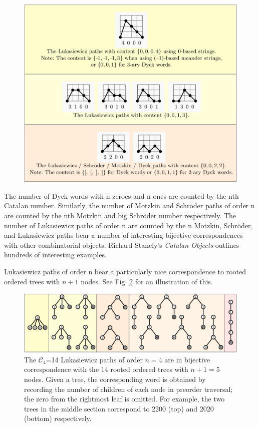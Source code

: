 \begin{figure}[]
	\centering
	\includegraphics[width = .95 \textwidth]{paths.png}
	\caption{}
	\label{paths}
\end{figure}


The number of Dyck words with n zeroes and n ones are counted by the nth Catalan number.  Similarly, the number of Motzkin and Schröder paths of order n are counted by the nth Motzkin and big Schröder number respectively. The number of Lukasiewicz paths of order n are counted by the n
Motzkin, Schröder, and Lukasiewicz paths bear a number of interesting bijective correspondences with other combinatorial objects. Richard Stanely's \emph{Catalan Objects} outlines hundreds of interesting examples.  

Lukasiewicz paths  of order n bear a particularly nice correspondence to rooted ordered trees with $n+1$ nodes. See Fig. \ref{trees} for an illustration of this.

\begin{figure}[]
	\centering
	\includegraphics[width = .95 \textwidth]{trees.png}
	\caption{The $\mathcal{C}_4$=14 Lukasiewicz paths of order $n=4$ are in bijective correspondence with the 14 rooted ordered trees with $n+1=5$ nodes.  Given a tree, the corresponding word is obtained by recording the number of children of each node in preorder traversal; the zero from the rightmost leaf is omitted.  For example, the two trees in the middle section correspond to 2200 (top) and 2020 (bottom) respectively.}
	\label{trees}
\end{figure}

